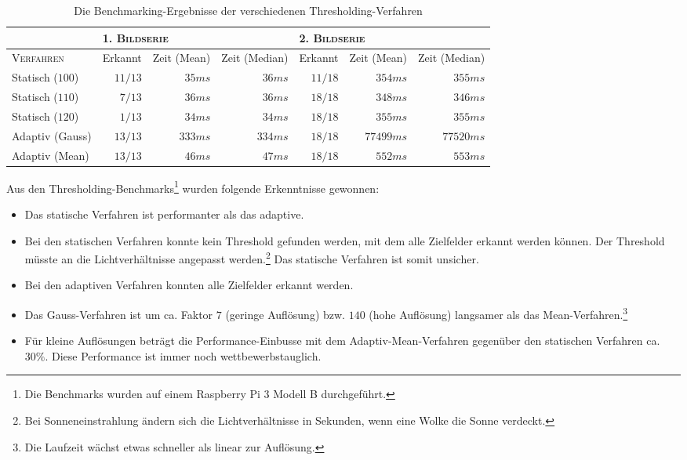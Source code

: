 \begin{table}
    {\small
    \begin{tabularx}{\textwidth}{l|r|r|r|r|r|r}
        & \multicolumn{3}{l|}{\textsc{1. Bildserie}} & \multicolumn{3}{l}{\textsc{2. Bildserie}} \\
        \hline
        \textsc{Verfahren} & Erkannt & Zeit (Mean) & Zeit (Median) & Erkannt & Zeit (Mean) & Zeit (Median) \\
        \hline
        Statisch ($100$) & $11/13$ & $35ms$ & $36ms$ & $11/18$ & $354ms$ & $355ms$ \\
        \hline
        Statisch ($110$) & $7/13$ & $36ms$ & $36ms$ & $18/18$ & $348ms$ & $346ms$ \\
        \hline
        Statisch ($120$) & $1/13$ & $34ms$ & $34ms$ & $18/18$ & $355ms$ & $355ms$ \\
        \hline
        Adaptiv (Gauss) & $13/13$ & $333ms$ & $334ms$ & $18/18$ & $77499ms$ & $77520ms$ \\
        \hline
        Adaptiv (Mean) & $13/13$ & $46ms$ & $47ms$ & $18/18$ & $552ms$ & $553ms$ \\
        \hline
    \end{tabularx}
    }
    \caption{Die Benchmarking-Ergebnisse der verschiedenen Thresholding-Verfahren}
    \label{tbl:thresholding}
\end{table}

Aus den Thresholding-Benchmarks\footnote{Die Benchmarks wurden auf einem Raspberry Pi 3 Modell B durchgeführt.} wurden folgende Erkenntnisse gewonnen:

\begin{itemize}
    \item Das statische Verfahren ist performanter als das adaptive.
    \item Bei den statischen Verfahren konnte kein Threshold gefunden werden, mit dem alle Zielfelder erkannt werden können. Der Threshold müsste an die Lichtverhältnisse angepasst werden.\footnote{Bei Sonneneinstrahlung ändern sich die Lichtverhältnisse in Sekunden, wenn eine Wolke die Sonne verdeckt.} Das statische Verfahren ist somit unsicher.
    \item Bei den adaptiven Verfahren konnten alle Zielfelder erkannt werden.
    \item Das Gauss-Verfahren ist um ca. Faktor $7$ (geringe Auflösung) bzw. $140$ (hohe Auflösung) langsamer als das Mean-Verfahren.\footnote{Die Laufzeit wächst etwas schneller als linear zur Auflösung.}
    \item Für kleine Auflösungen beträgt die Performance-Einbusse mit dem Adaptiv-Mean-Verfahren gegenüber den statischen Verfahren ca. $30\%$. Diese Performance ist immer noch wettbewerbstauglich.
\end{itemize}

